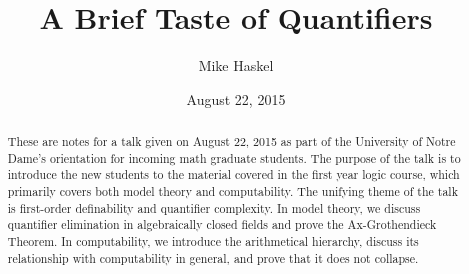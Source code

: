\documentclass{article}
\title{A Brief Taste of Quantifiers}
\author{Mike Haskel}
\date{August 22, 2015}
\theoremstyle{plain}
\theoremstyle{definition}
\begin{document}
\maketitle

\begin{abstract}
  These are notes for a talk given on August 22, 2015 as part of the
  University of Notre Dame's orientation for incoming math graduate
  students. The purpose of the talk is to introduce the new students
  to the material covered in the first year logic course, which
  primarily covers both model theory and computability. The unifying
  theme of the talk is first-order definability and quantifier
  complexity. In model theory, we discuss quantifier elimination in
  algebraically closed fields and prove the Ax-Grothendieck
  Theorem. In computability, we introduce the arithmetical hierarchy,
  discuss its relationship with computability in general, and prove
  that it does not collapse.
\end{abstract}
\end{document}
